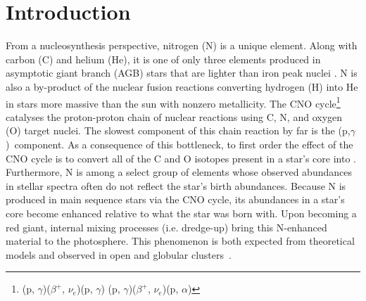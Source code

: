 \documentclass[ms.tex]{subfiles}
\begin{document}
\section{Introduction}
\label{sec:intro}

From a nucleosynthesis perspective, nitrogen (N) is a unique element.
Along with carbon (C) and helium (He), it is one of only three elements produced
in asymptotic giant branch (AGB) stars that are lighter than iron peak nuclei
\citep{Johnson2019}.
N is also a by-product of the nuclear fusion reactions converting hydrogen (H)
into He in stars more massive than the sun with nonzero metallicity.
The CNO cycle\footnote{
	\Ctwelve(p, $\gamma$)\Nthirteen($\beta^+$, $\nu_e$)\Cthirteen(p, $\gamma$)
	\Nfourteen(p, $\gamma$)\Ofifteen($\beta^+$, $\nu_e$)\Nfifteen(p, $\alpha$)
	\Ctwelve
} catalyses the proton-proton chain of nuclear reactions
\citep*[e.g.][]{Suliga2020} using C, N, and oxygen (O) target nuclei.
The slowest component of this chain reaction by far is the
\Nfourteen(p,$\gamma$)\Ofifteen~component.
As a consequence of this bottleneck, to first order the effect of the CNO cycle
is to convert all of the C and O isotopes present in a star's core into
\Nfourteen.
Furthermore, N is among a select group of elements whose observed abundances
in stellar spectra often do not reflect the star's birth abundances.
Because N is produced in main sequence stars via the CNO cycle, its abundances
in a star's core become enhanced relative to what the star was born with.
Upon becoming a red giant, internal mixing processes (i.e. dredge-up) bring this
N-enhanced material to the photosphere.
This phenomenon is both expected from theoretical models and observed in open
and globular clusters~\citep{Gilroy1989, Korn2007, Lind2008, Souto2018,
Souto2019, Vincenzo2021}.
\end{document}
